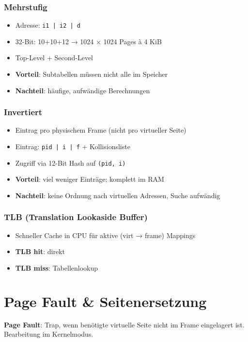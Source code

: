 \documentclass[11pt, a4paper]{article}
\begin{document}
\subsubsection{Mehrstufig}
\begin{itemize}
  \item Adresse: \texttt{i1 | i2 | d}
  \item 32-Bit: 10+10+12 → 1024 × 1024 Pages à 4 KiB
  \item Top-Level + Second-Level
  \item \textbf{Vorteil}: Subtabellen müssen nicht alle im Speicher
  \item \textbf{Nachteil}: häufige, aufwändige Berechnungen
\end{itemize}


\subsubsection{Invertiert}
\begin{itemize}
  \item Eintrag pro physischem Frame (nicht pro virtueller Seite)
  \item Eintrag: \texttt{pid | i | f} + Kollisionsliste
  \item Zugriff via 12-Bit Hash auf \texttt{(pid, i)}
  \item \textbf{Vorteil}: viel weniger Einträge; komplett im RAM
  \item \textbf{Nachteil}: keine Ordnung nach virtuellen Adressen, Suche aufwändig
\end{itemize}


\subsubsection{TLB (Translation Lookaside Buffer)}
\begin{itemize}
  \item Schneller Cache in CPU für aktive (virt → frame) Mappings
  \item \textbf{TLB hit}: direkt
  \item \textbf{TLB miss}: Tabellenlookup
\end{itemize}


\section{Page Fault \& Seitenersetzung}

\textbf{Page Fault}: Trap, wenn benötigte virtuelle Seite nicht im Frame eingelagert ist. Bearbeitung im Kernelmodus.
\end{document}
